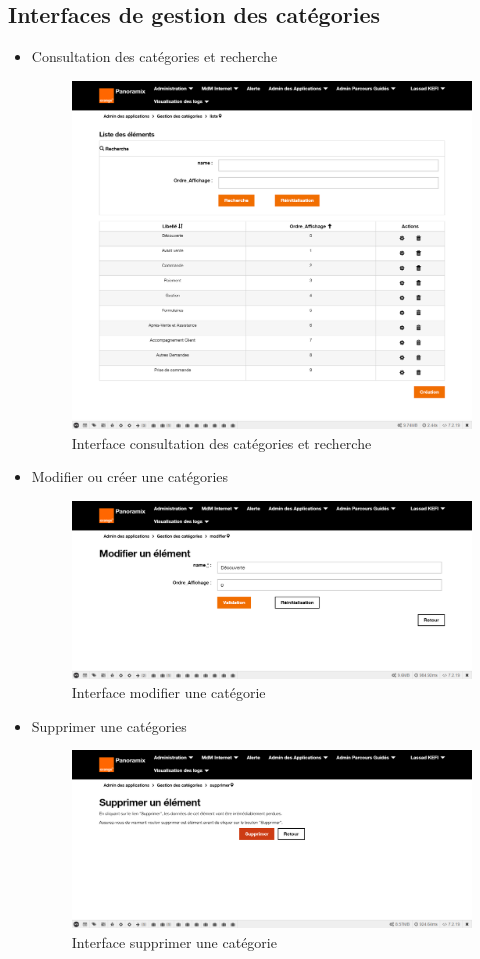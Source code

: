 \subsection{Interfaces de gestion des catégories}
\begin{itemize}
	\item Consultation des catégories et recherche
	\begin{figure}[H]
		\centering
		\includegraphics[width=0.5\linewidth]{img/screenshots/categorie/index}
		\caption[Interface consultation des catégories et recherche]{Interface consultation des catégories et recherche}
		\label{fig:index-categorie}
	\end{figure}
	
	\item Modifier ou créer une catégories
	\begin{figure}[H]
		\centering
		\includegraphics[width=0.6\linewidth]{img/screenshots/categorie/create-edit}
		\caption[Interface modifier une catégorie]{Interface modifier une catégorie}
		\label{fig:edit-categorie}
	\end{figure}

	\item Supprimer une catégories
	\begin{figure}[H]
		\centering
		\includegraphics[width=0.6\linewidth]{img/screenshots/categorie/delete}
		\caption[Interface supprimer une catégorie]{Interface supprimer une catégorie}
		\label{fig:delete-categorie}
	\end{figure}
\end{itemize}

